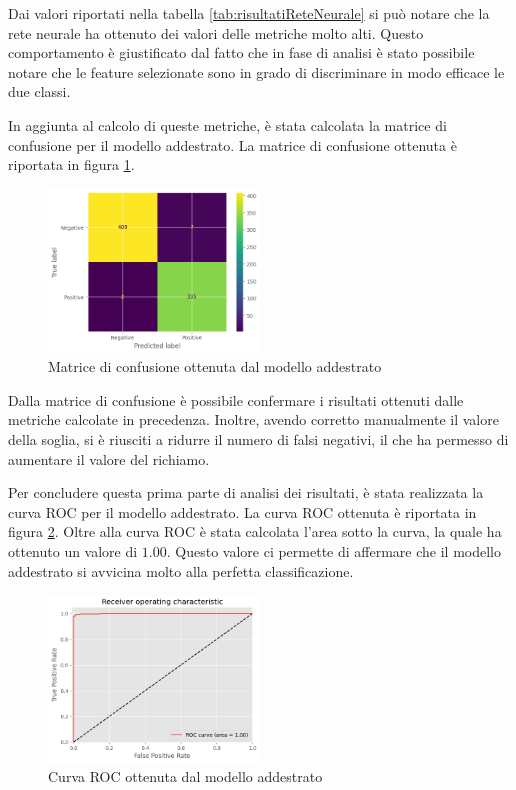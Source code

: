 Dai valori riportati nella tabella \ref{tab:risultatiReteNeurale} si può notare
che la rete neurale ha ottenuto dei valori delle metriche molto alti. Questo
comportamento è giustificato dal fatto che in fase di analisi è stato possibile
notare che le feature selezionate sono in grado di discriminare in modo efficace
le due classi.

In aggiunta al calcolo di queste metriche, è stata calcolata la matrice di confusione
per il modello addestrato. La matrice di confusione ottenuta è riportata in figura
\ref{fig:matriceConfusioneReteNeurale}.

\begin{figure}[!ht]
    \centering
    \includegraphics[width=0.5\textwidth]{img/rete/matrice_confusione.png}
    \caption{Matrice di confusione ottenuta dal modello addestrato}
    \label{fig:matriceConfusioneReteNeurale}
\end{figure}

Dalla matrice di confusione è possibile confermare i risultati ottenuti dalle
metriche calcolate in precedenza. Inoltre, avendo corretto manualmente il valore
della soglia, si è riusciti a ridurre il numero di falsi negativi, il che ha
permesso di aumentare il valore del richiamo.

Per concludere questa prima parte di analisi dei risultati, è stata realizzata
la curva ROC per il modello addestrato. La curva ROC ottenuta è riportata in
figura \ref{fig:curvaRocReteNeurale}. Oltre alla curva ROC è stata calcolata
l'area sotto la curva, la quale ha ottenuto un valore di $1.00$. Questo valore
ci permette di affermare che il modello addestrato si avvicina molto alla
perfetta classificazione.

\begin{figure}[!ht]
    \centering
    \includegraphics[width=0.5\textwidth]{img/rete/curva_roc.png}
    \caption{Curva ROC ottenuta dal modello addestrato}
    \label{fig:curvaRocReteNeurale}
\end{figure}
